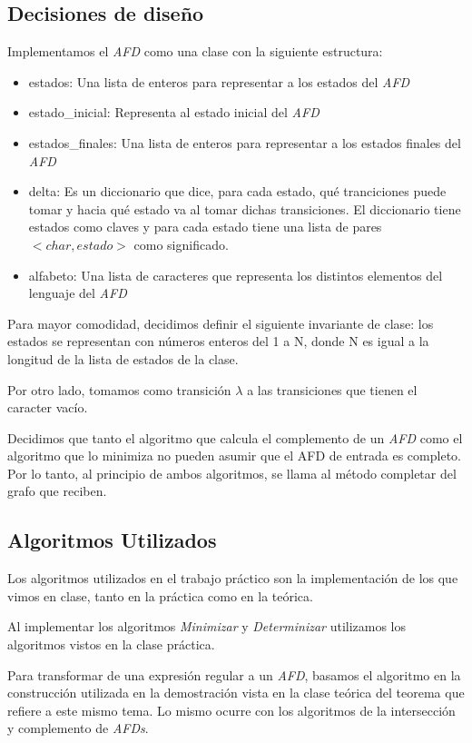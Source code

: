 \subsection{Decisiones de diseño}
Implementamos el \emph{AFD} como una clase con la siguiente estructura:

\begin{itemize}
	\item estados: Una lista de enteros para representar a los estados del \emph{AFD}
	\item estado\_inicial: Representa al estado inicial del \emph{AFD}
	\item estados\_finales: Una lista de enteros para representar a los estados finales del \emph{AFD}
	\item delta: Es un diccionario que dice, para cada estado, qué tranciciones puede tomar y hacia qué estado va al tomar dichas transiciones. El diccionario tiene estados como claves y para cada estado tiene una lista de pares $<char, estado>$ como significado.
	\item alfabeto: Una lista de caracteres que representa los distintos elementos del lenguaje del \emph{AFD}
\end{itemize}

Para mayor comodidad, decidimos definir el siguiente invariante de clase: los estados se representan con números enteros del 1 a N, donde N es igual a la longitud de la lista de estados de la clase.

Por otro lado, tomamos como transición $\lambda$ a las transiciones que tienen el caracter vacío.

Decidimos que tanto el algoritmo que calcula el complemento de un \emph{AFD} como el algoritmo que lo minimiza no pueden asumir que el AFD de entrada es completo. Por lo tanto, al principio de ambos algoritmos, se llama al método completar del grafo que reciben.

\subsection{Algoritmos Utilizados}

Los algoritmos utilizados en el trabajo práctico son la implementación de los que vimos en clase, tanto en la práctica como en la teórica.

Al implementar los algoritmos \emph{Minimizar} y \emph{Determinizar} utilizamos los algoritmos vistos en la clase práctica.

Para transformar de una expresión regular a un \emph{AFD}, basamos el algoritmo en la construcción utilizada en la demostración vista en la clase teórica del teorema que refiere a este mismo tema. Lo mismo ocurre con los algoritmos de la intersección y complemento de \emph{AFDs}.

